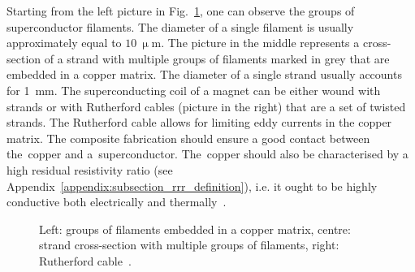 Starting from the left picture in Fig.~\ref{fig:strand_and_filaments}, one can observe the groups of superconductor filaments. The diameter of a single filament is usually approximately equal to $10~\upmu$m. The picture in the middle represents a cross-section of a strand with multiple groups of filaments marked in grey that are embedded in a copper matrix. The diameter of a single strand usually accounts for 1~mm. The superconducting coil of a magnet can be either wound with strands or with Rutherford cables (picture in the right) that are a set of twisted strands. The Rutherford cable allows for limiting eddy currents in the copper matrix. The composite fabrication should ensure a good contact between the~copper and a~superconductor. The~copper should also be characterised by a high residual resistivity ratio (see Appendix~\ref{appendix:subsection_rrr_definition}), i.e. it ought to be highly conductive both electrically and thermally~\cite[p.~31-33]{superconducting_accelerator_magnets}.

\begin{figure}[H]
    \centering
    \caption{Left: groups of filaments embedded in a copper matrix, centre: strand cross-section with multiple groups of filaments, right: Rutherford cable~\cite{lhc_machine_outreach}.}
    \label{fig:strand_and_filaments}
\end{figure}

